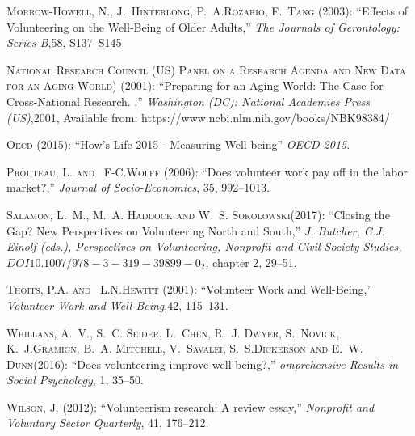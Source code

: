 \documentclass[10pt, letterpaper]{article}
\begin{document}
\begin{spacing}{1.4}
\begin{thebibliography}{87}
\textsc{Morrow-Howell, N., J.~Hinterlong, P.~A.Rozario, F.~Tang} (2003):
  \enquote{Effects of Volunteering on the Well-Being of Older Adults,} \emph{The Journals of Gerontology: Series B},58, S137--S145

\textsc{National Research Council (US) Panel on a Research Agenda and New Data for an Aging World)} (2001):
  \enquote{Preparing for an Aging World: The Case for Cross-National Research. ,} \emph{Washington (DC): National Academies Press (US)},2001, Available from: https://www.ncbi.nlm.nih.gov/books/NBK98384/



\textsc{Oecd} (2015): \enquote{How's Life  2015 - Measuring Well-being} \emph{OECD 2015}.
  
\textsc{Prouteau, L. and ~F-C.Wolff } (2006): \enquote{Does volunteer work pay off in the labor market?,} \emph{Journal of Socio-Economics}, 35, 992--1013.

 \textsc{Salamon, L.~M., M.~A. Haddock and W.~S. Sokolowski}(2017):
 \enquote{Closing the Gap? New Perspectives on Volunteering North and South,} \emph{J. Butcher, C.J. Einolf (eds.), Perspectives on Volunteering, Nonprofit and Civil Society Studies, $DOI 10.1007/978-3-319-39899-0_2$}, chapter 2, 29--51.
  
\textsc{Thoits, P.A. and ~L.N.Hewitt } (2001): \enquote{Volunteer Work and Well-Being,} \emph{Volunteer Work and Well-Being},42, 115--131.


\textsc{Whillans, A.~V., S.~C. Seider, L.~Chen, R.~J. Dwyer, S.~Novick, K.~J.Gramign, B.~A. Mitchell, V.~Savalei, S.~S.Dickerson and E.~W. Dunn}(2016):
  \enquote{Does volunteering improve well-being?,} \emph{omprehensive Results in Social Psychology}, 1, 35--50.

  
\textsc{Wilson, J.} (2012): \enquote{Volunteerism research: A
  review essay,} \emph{Nonprofit and Voluntary Sector Quarterly}, 41, 176--212.


\end{thebibliography}
\end{spacing}
\end{document}
